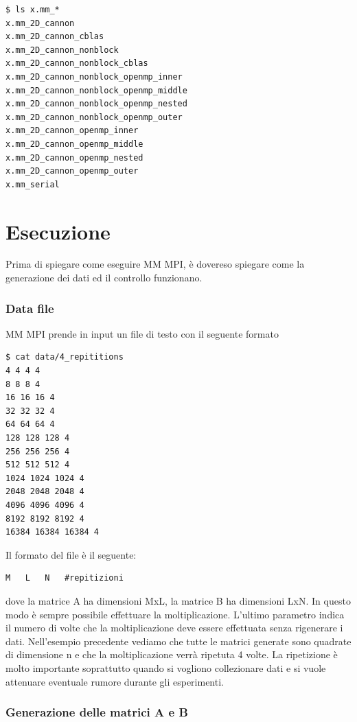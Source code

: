 \begin{lstlisting}
$ ls x.mm_*
x.mm_2D_cannon
x.mm_2D_cannon_cblas
x.mm_2D_cannon_nonblock
x.mm_2D_cannon_nonblock_cblas
x.mm_2D_cannon_nonblock_openmp_inner
x.mm_2D_cannon_nonblock_openmp_middle
x.mm_2D_cannon_nonblock_openmp_nested
x.mm_2D_cannon_nonblock_openmp_outer
x.mm_2D_cannon_openmp_inner
x.mm_2D_cannon_openmp_middle
x.mm_2D_cannon_openmp_nested
x.mm_2D_cannon_openmp_outer
x.mm_serial
\end{lstlisting}

\section{Esecuzione}

Prima di spiegare come eseguire MM MPI, \`{e} dovereso spiegare come la generazione dei dati ed il controllo funzionano.

\subsubsection{Data file}
MM MPI prende in input un file di testo con il seguente formato

\begin{lstlisting}
$ cat data/4_repititions
4 4 4 4
8 8 8 4
16 16 16 4
32 32 32 4
64 64 64 4
128 128 128 4
256 256 256 4
512 512 512 4
1024 1024 1024 4
2048 2048 2048 4
4096 4096 4096 4
8192 8192 8192 4
16384 16384 16384 4
\end{lstlisting}

Il formato del file \`{e} il seguente:

\begin{lstlisting}
M   L   N   #repitizioni
\end{lstlisting}

dove la matrice A ha dimensioni MxL, la matrice B ha dimensioni LxN. In questo modo \`{e} sempre possibile effettuare la moltiplicazione. L'ultimo parametro indica il numero di volte che la moltiplicazione deve essere effettuata senza rigenerare i dati. Nell'esempio precedente vediamo che tutte le matrici generate sono quadrate di dimensione n e che la moltiplicazione verr\`{a} ripetuta 4 volte.
La ripetizione \`{e} molto importante soprattutto quando si vogliono collezionare dati e si vuole attenuare eventuale rumore durante gli esperimenti.

\subsubsection{Generazione delle matrici A e B}

